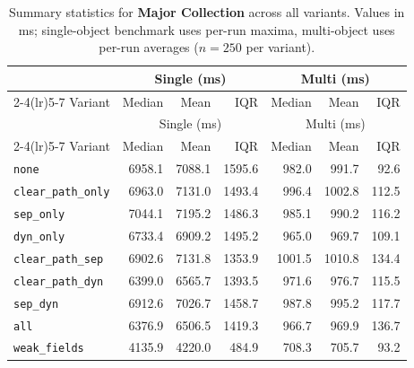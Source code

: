 \begin{longtable}{l rrr rrr}
\caption[Major Collection summary statistics]{Summary statistics for \textbf{Major Collection} across all variants. Values in ms; single-object benchmark uses per-run maxima, multi-object uses per-run averages ($n=250$ per variant).}\label{tab:stats-major} \\
\toprule
 & \multicolumn{3}{c}{Single (ms)} & \multicolumn{3}{c}{Multi (ms)} \\
\cmidrule(lr){2-4}\cmidrule(lr){5-7}
Variant & Median & Mean & IQR & Median & Mean & IQR \\
\midrule
\endfirsthead
\toprule
 & \multicolumn{3}{c}{Single (ms)} & \multicolumn{3}{c}{Multi (ms)} \\
\cmidrule(lr){2-4}\cmidrule(lr){5-7}
Variant & Median & Mean & IQR & Median & Mean & IQR \\
\midrule
\endhead
\bottomrule
\endfoot
\texttt{none} & 6958.1 & 7088.1 & 1595.6 & 982.0 & 991.7 & 92.6 \\
\texttt{clear\_path\_only} & 6963.0 & 7131.0 & 1493.4 & 996.4 & 1002.8 & 112.5 \\
\texttt{sep\_only} & 7044.1 & 7195.2 & 1486.3 & 985.1 & 990.2 & 116.2 \\
\texttt{dyn\_only} & 6733.4 & 6909.2 & 1495.2 & 965.0 & 969.7 & 109.1 \\
\texttt{clear\_path\_sep} & 6902.6 & 7131.8 & 1353.9 & 1001.5 & 1010.8 & 134.4 \\
\texttt{clear\_path\_dyn} & 6399.0 & 6565.7 & 1393.5 & 971.6 & 976.7 & 115.5 \\
\texttt{sep\_dyn} & 6912.6 & 7026.7 & 1458.7 & 987.8 & 995.2 & 117.7 \\
\texttt{all} & 6376.9 & 6506.5 & 1419.3 & 966.7 & 969.9 & 136.7 \\
\texttt{weak\_fields} & 4135.9 & 4220.0 & 484.9 & 708.3 & 705.7 & 93.2 \\
\end{longtable}
